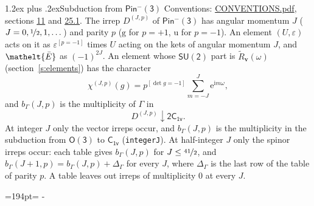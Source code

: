 \documentclass[10pt,a4paper]{article}
\makeatletter
\renewcommand\section{\@startsection{section}{1}{\z@}{-3ex plus -1ex minus -.2ex}%
  {1.2ex plus .2ex}{\normalfont\large\sffamily\bfseries\color{parttitle}}}
\newcommand{\needspace}[1]{\par\penalty-100\begingroup\dimen0=#1\relax\dimen2=\pagegoal
  \advance\dimen2-\pagetotal\ifdim\dimen0>\dimen2\relax\ifdim\dimen2>0pt\vfil\break\fi\fi
  \endgroup}
\numberwithin{equation}{section}
\newcommand{\eltfont}[1]{{\let\sigma\eltsigma\mathelt{#1}}}
\newcommand{\grp}[1]{\mathsf{#1}}
\newcommand{\elt}[1]{\eltfont{#1}}
\newcommand{\ptag}[1]{\mathrm{#1}}
\newcommand{\iverson}[1]{[#1]}
\newcommand{\restr}[2]{#1\!\downarrow#2}
\newcommand{\vv}{\mathbf{v}}
\newcommand{\iunit}{\mathrm{i}}
\newcommand{\expe}{\mathrm{e}}
\newcommand{\irrJp}[2]{D^{(#1,#2)}}
\newcommand{\barred}[1]{\bar{#1}}
\newcommand{\lift}[1]{\tilde{#1}}
\makeatother
\begin{document}
\section{Subduction from \texorpdfstring{$\grp{Pin^{-}(3)}$}{Pin(3)}}\label{s:subduction_parent}
Conventions: \href{../../CONVENTIONS.pdf}{CONVENTIONS.pdf}, sections \href{../../../rotation/CONVENTIONS.pdf\#conv.11}{11} and \href{../../CONVENTIONS.pdf\#conv.25.1}{25.1}.
\leavevmode\label{n:index.J}\label{n:index.parity}\label{n:irrep.o3}The irrep $\irrJp{J}{p}$ of \href{Pinminus3.pdf}{$\grp{Pin^{-}(3)}$} has angular momentum $J$ ($J = 0, \nicefrac{1}{2}, 1, \dots$) and parity $p$ ($\ptag{g}$ for $p = +1$, $\ptag{u}$ for $p = -1$). An element $(U, \varepsilon)$ acts on it as $\varepsilon^{[p = -1]}$ times $U$ acting on the kets of angular momentum $J$, and $\elt{\barred{E}}$ as $(-1)^{2J}$. \label{n:function.character.parent}\label{n:function.multiplicity}An element whose $\grp{SU(2)}$ part is $\lift{R}_{\vv}(\omega)$ (section~\ref{s:elements}) has the character
\begin{equation}\label{e:chi}\chi^{(J,p)}(g) = p^{\iverson{\det g = -1}}\sum_{m=-J}^{J} \expe^{\iunit m\omega},\end{equation}
and $b_\Gamma(J, p)$ is the multiplicity of $\Gamma$ in
\begin{equation}\label{e:parent}\restr{\irrJp{J}{p}}{\grp{2C_{1v}}}.\end{equation}
At integer $J$ only the vector irreps occur, and $b_\Gamma(J, p)$ is the multiplicity in the subduction from $\grp{O(3)}$ to \href{../../../rotation/data/pdf/C1v.pdf}{$\grp{C_{1v}}$} (\texttt{integerJ}). \label{n:index.increment}At half-integer $J$ only the spinor irreps occur: each table gives $b_\Gamma(J, p)$ for $J \le \nicefrac{41}{2}$, and $b_\Gamma(J + 1, p) = b_\Gamma(J, p) + \Delta_\Gamma$ for every $J$, where $\Delta_\Gamma$ is the last row of the table of parity $p$. A table leaves out irreps of multiplicity 0 at every $J$.
\needspace{194pt}
\end{document}
